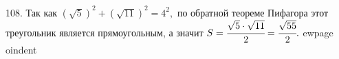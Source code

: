 108. Так как $(\sqrt{5})^2+(\sqrt{11})^2=4^2,$ по обратной теореме Пифагора этот треугольник является прямоугольным, а значит $S=\cfrac{\sqrt{5}\cdot\sqrt{11}}{2}=\cfrac{\sqrt{55}}{2}.$
ewpage
oindent
